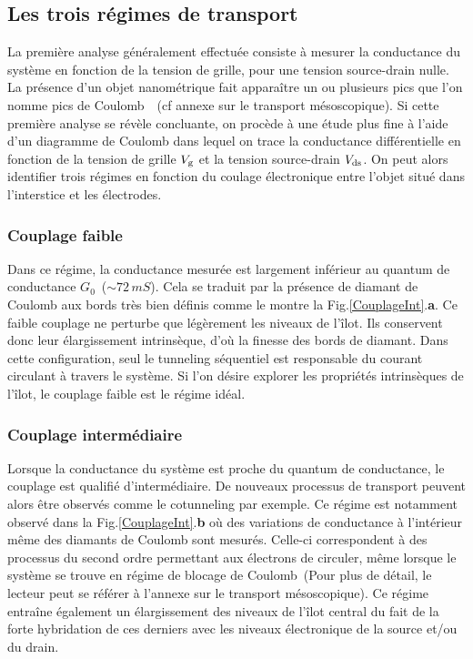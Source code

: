 \subsection{Les trois régimes de transport}
La première analyse généralement effectuée consiste à mesurer la conductance du système en fonction de la tension de grille, pour une tension source-drain nulle. La présence d'un objet nanométrique fait apparaître un ou plusieurs pics que l'on nomme pics de Coulomb~\cite{Beenakker1991,Wiel2002,Hanson2007}~(cf annexe sur le transport mésoscopique). Si cette première analyse se révèle concluante, on procède à une étude plus fine à l'aide d'un diagramme de Coulomb dans lequel on trace la conductance différentielle en fonction de la tension de grille $V_{\rm{g}}$ et la tension source-drain $V_{\rm{ds}}$. On peut alors identifier trois régimes en fonction du coulage électronique entre l'objet situé dans l'interstice et les électrodes.

\subsubsection{Couplage faible}
Dans ce régime, la conductance mesurée est largement inférieur au quantum de conductance $G_0$~($\sim 72\,mS$). Cela se traduit par la présence de diamant de Coulomb aux bords très bien définis comme le montre la Fig.\ref{CouplageInt}.\textbf{a}. Ce faible couplage ne perturbe que légèrement les niveaux de l'îlot. Ils conservent donc leur élargissement intrinsèque, d'où la finesse des bords de diamant. Dans cette configuration, seul le tunneling séquentiel est responsable du courant circulant à travers le système. Si l'on désire explorer les propriétés intrinsèques de l'îlot, le couplage faible est le régime idéal.

\subsubsection{Couplage intermédiaire}
Lorsque la conductance du système est proche du quantum de conductance, le couplage est qualifié d'intermédiaire. De nouveaux processus de transport peuvent alors être observés comme le cotunneling par exemple. Ce régime est notamment observé dans la Fig.\ref{CouplageInt}.\textbf{b} où des variations de conductance à l'intérieur même des diamants de Coulomb sont mesurés. Celle-ci correspondent à des processus du second ordre permettant aux électrons de circuler, même lorsque le système se trouve en régime de blocage de Coulomb~(Pour plus de détail, le lecteur peut se référer à l'annexe sur le transport mésoscopique). Ce régime entraîne également un élargissement des niveaux de l'îlot central du fait de la forte hybridation de ces derniers avec les niveaux électronique de la source et/ou du drain.

